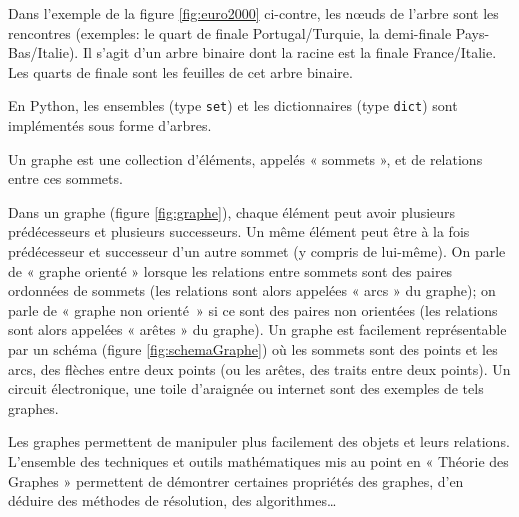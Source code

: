 \begin{ex}\label{ex:euro2000}
Dans l'exemple de la figure \ref{fig:euro2000} ci-contre, les n\oe uds de
l'arbre sont les rencontres (exemples: le quart de finale Portugal/Turquie,
la demi-finale Pays-Bas/Italie). Il s'agit d'un arbre binaire
dont la racine est la finale France/Italie. Les quarts de finale sont les feuilles
de cet arbre binaire.
\end{ex}
En {\sc Python}, les ensembles (type {\tt set}) et les dictionnaires (type {\tt dict}) 
sont implémentés sous forme d'arbres.

\begin{defin}[graphe]
Un graphe est une collection d'éléments, appelés « sommets », et de relations entre ces sommets.
\end{defin}

Dans un graphe (figure \ref{fig:graphe}), chaque élément peut avoir plusieurs prédécesseurs et plusieurs successeurs.
Un même élément peut être à la fois prédécesseur et successeur d'un autre sommet (y compris de lui-même).
On parle de « graphe orienté » lorsque les relations entre sommets sont des paires ordonnées de sommets
(les relations sont alors appelées « arcs » du graphe); on parle de « graphe non orienté~» si ce sont des paires
non orientées (les relations sont alors appelées « arêtes » du graphe).
Un graphe est facilement représentable par un schéma (figure \ref{fig:schemaGraphe})
où les sommets sont des points et les arcs, des flèches entre
deux points (ou les arêtes, des traits entre deux points).
Un circuit électronique, une toile d'araignée ou internet sont des exemples
de tels graphes.

Les graphes permettent de manipuler plus facilement des objets et leurs
relations. L'ensemble des
techniques et outils mathématiques mis au point en « Théorie des Graphes »
permettent de démontrer certaines propriétés des graphes, d'en déduire des
méthodes de résolution, des algorithmes\ldots


